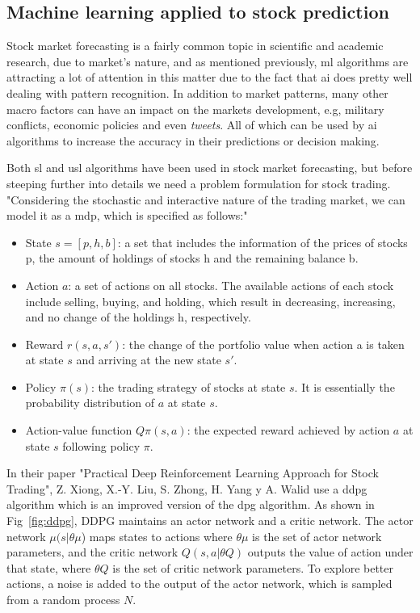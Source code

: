 \subsection{Machine learning applied to stock prediction}

Stock market forecasting is a fairly common topic in scientific and academic research, due to market's nature, and as mentioned previously, \gls{ml} algorithms are attracting a lot of attention in this matter due to the fact that \gls{ai} does pretty well dealing with pattern recognition. In addition to market patterns, many other macro factors can have an impact on the markets development, e.g, military conflicts, economic policies and even \textit{tweets}. All of which can be used by \gls{ai} algorithms to increase the accuracy in their predictions or decision making.

Both \gls{sl} and \gls{usl} algorithms have been used in stock market forecasting, but before steeping further into details we need a problem formulation for stock trading. "Considering the stochastic and interactive nature of the trading market, we can model it as a \gls{mdp}, which is specified as follows:"~\cite{practicalDeepLearningStock}

\begin{itemize}
    \item State \(s = [p, h, b] \): a set that includes the information of the prices of stocks p, the amount of holdings of stocks h and the remaining balance b.
    \item Action \(a\): a set of actions on all stocks. The available actions of each stock include selling, buying, and holding, which result in decreasing, increasing, and no change of the holdings h, respectively.
    \item Reward \(r(s, a, s')\): the change of the portfolio value when action a is taken at state \(s\) and arriving at the new state \(s'\).
    \item Policy \(\pi(s)\): the trading strategy of stocks at state \(s\). It is essentially the probability distribution of \(a\) at state \(s\).
    \item Action-value function \(Q\pi(s, a)\): the expected reward achieved by action \(a\) at state \(s\) following policy \(\pi\).
\end{itemize}

In their paper "Practical Deep Reinforcement Learning Approach for Stock Trading", Z. Xiong, X.-Y. Liu, S. Zhong, H. Yang y A. Walid\cite{practicalDeepLearningStock} use a \gls{ddpg} algorithm which is an improved version of the \gls{dpg} algorithm. As shown in Fig~\ref{fig:ddpg}, DDPG maintains an actor network and a critic network. The actor network \(\mu(s|\theta\mu\)) maps states to actions where \(\theta\mu\) is the set of actor network parameters, and the critic network \(Q(s, a|\theta Q)\) outputs the value of action under that state, where \(\theta Q\) is the set of critic network parameters. To explore better actions, a noise is added to the output of the actor network, which is sampled from a random process \(N\).~\cite{practicalDeepLearningStock} 

